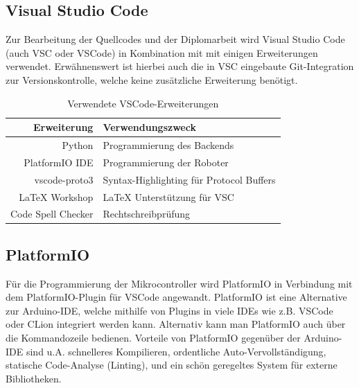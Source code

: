 \subsection{Visual Studio Code}
Zur Bearbeitung der Quellcodes und der Diplomarbeit wird Visual Studio Code (auch VSC oder VSCode)
in Kombination mit mit einigen Erweiterungen verwendet.
%
Erwähnenswert ist hierbei auch die in VSC eingebaute Git-Integration zur Versionskontrolle,
welche keine zusätzliche Erweiterung benötigt.
\begin{table}[H]
    \centering
    \begin{tabular}{r|l}
        Erweiterung         & Verwendungszweck \\ \hline
        Python              & Programmierung des Backends \\
        PlatformIO IDE      & Programmierung der Roboter \\
        vscode-proto3       & Syntax-Highlighting für Protocol Buffers \\
        LaTeX Workshop      & LaTeX Unterstützung für VSC \\
        Code Spell Checker  & Rechtschreibprüfung \\
    \end{tabular}
    \caption{Verwendete VSCode-Erweiterungen}
    \label{tab:vsc_plugins}
\end{table}
\subsection{PlatformIO}
Für die Programmierung der Mikrocontroller wird PlatformIO \cite{platformio}
in Verbindung mit dem PlatformIO-Plugin für VSCode angewandt.
%
PlatformIO ist eine Alternative zur Arduino-IDE,
welche mithilfe von Plugins in viele IDEs wie z.B. VSCode oder CLion integriert werden kann.
%
Alternativ kann man PlatformIO auch über die Kommandozeile bedienen.
%
Vorteile von PlatformIO gegenüber der Arduino-IDE sind u.A. schnelleres Kompilieren,
ordentliche Auto-Vervollständigung,
statische Code-Analyse (Linting),
und ein schön geregeltes System für externe Bibliotheken.

